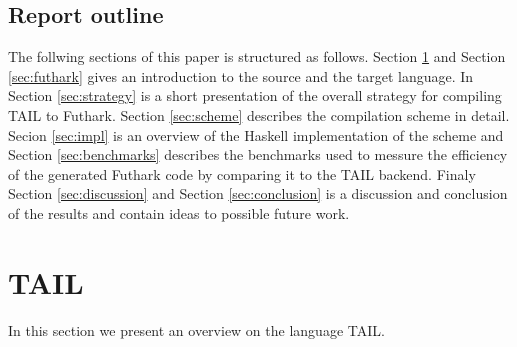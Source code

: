 \documentclass[11pt]{article}
\begin{document}
\subsection{Report outline}
The follwing sections of this paper is structured as follows. 
Section \ref{sec:tail} and Section \ref{sec:futhark} gives an introduction to the source and the target language. 
In Section \ref{sec:strategy} is a short presentation of the overall strategy for compiling TAIL to Futhark.
Section \ref{sec:scheme} describes the compilation scheme in detail. Secion \ref{sec:impl} is an overview of the Haskell implementation of the scheme and Section \ref{sec:benchmarks} describes the benchmarks used to messure the efficiency of the generated Futhark code by comparing it to the TAIL backend. Finaly Section \ref{sec:discussion} and Section \ref{sec:conclusion} is a discussion and conclusion of the results and contain ideas to possible future work. 






\section{TAIL}
\label{sec:tail}

In this section we present an overview on the language TAIL.
\end{document}
